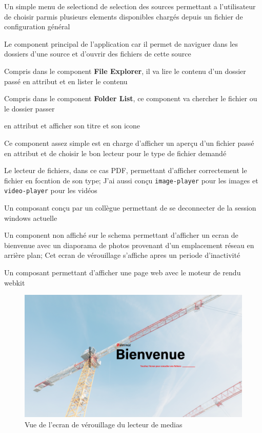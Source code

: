 \begin{description}
    \item[Source Selector] Un simple menu de selectiond de selection des sources permettant a l'utilisateur de choisir parmis plusieurs elements disponibles chargés depuis un fichier de configuration général
    \item[File Explorer] Le component principal de l'application car il permet de naviguer dans les dossiers d'une source et d'ouvrir des fichiers  de cette source
    \item[Folder List] Compris dans le component \textbf{File Explorer}, il va lire le contenu d'un dossier passé en attribut et en lister le contenu
    \item[File System Element] Compris dans le component \textbf{Folder List}, ce component va chercher le fichier ou le dossier passer
    \item en attribut et afficher son titre et son icone
    \item[File Viewer] Ce component assez simple est en charge d'afficher un aperçu d'un fichier passé en attribut et de choisir le bon lecteur pour le type de fichier demandé
    \item[PDF Player] Le lecteur de fichiers, dans ce cas PDF, permettant d'afficher correctement le fichier en focntion de son type; J'ai aussi conçu \texttt{image-player} pour les images et \texttt{video-player} pour les vidéos
    \item[Logout] Un composant conçu par un collègue permettant de se deconnecter de la session windows actuelle
    \item[Lock Screen] Un component non affiché sur le schema permettant d'afficher un ecran de bienvenue avec un diaporama de photos provenant d'un emplacement réseau en arrière plan; Cet ecran de vérouillage s'affiche apres un periode d'inactivité
    \item[Web Frame] Un composant permettant d'afficher une page web avec le moteur de rendu webkit
\end{description}

\begin{figure}[h]
    \centering
    \includegraphics[scale=0.5]{img/media-reader-lock.png}
    \caption{Vue de l'ecran de vérouillage du lecteur de medias}
\end{figure}

